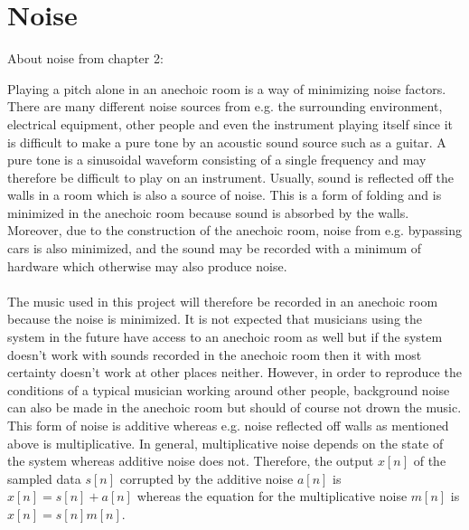 \clearpage
\section{Noise}
About noise from chapter 2: \textregistered

Playing a pitch alone in an anechoic room is a way of minimizing noise factors. There are many different noise sources from e.g. the surrounding environment, electrical equipment, other people and even the instrument playing itself since it is difficult to make a pure tone by an acoustic sound source such as a guitar. A pure tone is a sinusoidal waveform consisting of a single frequency and may therefore be difficult to play on an instrument. \cite{AcousticNoise} Usually, sound is reflected off the walls in a room which is also a source of noise. This is a form of folding and is minimized in the anechoic room because sound is absorbed by the walls. Moreover, due to the construction of the anechoic room, noise from e.g. bypassing cars is also minimized, and the sound may be recorded with a minimum of hardware which otherwise may also produce noise.
\\ \\
The music used in this project will therefore be recorded in an anechoic room because the noise is minimized. It is not expected that musicians using the system in the future have access to an anechoic room as well but if the system doesn't work with sounds recorded in the anechoic room then it with most certainty doesn't work at other places neither. However, in order to reproduce the conditions of a typical musician working around other people, background noise can also be made in the anechoic room but should of course not drown the music. This form of noise is additive whereas e.g. noise reflected off walls as mentioned above is multiplicative. In general, multiplicative noise depends on the state of the system whereas additive noise does not. Therefore, the output $x[n]$ of the sampled data $s[n]$ corrupted by the additive noise $a[n]$ is $x[n] = s[n] + a[n]$ whereas the equation for the multiplicative noise $m[n]$ is $x[n] = s[n]m[n]$.